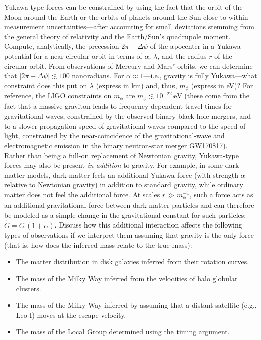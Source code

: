 \documentclass[12pt]{article}
\begin{document}
 Yukawa-type forces can be constrained by using
the fact that the orbit of the Moon around the Earth or the orbits of
planets around the Sun close to within measurement
uncertainties---after accounting for small deviations stemming from
the general theory of relativity and the Earth/Sun's quadrupole
moment. Compute, analytically, the precession $2\pi-\Delta \psi$ of
the apocenter in a Yukawa potential for a near-circular orbit in terms
of $\alpha$, $\lambda$, and the radius $r$ of the circular orbit. From
observations of Mercury and Mars' orbits, we can determine that
$|2\pi-\Delta \psi| \lesssim 100$ nanoradians. For $\alpha \approx
1$---i.e., gravity is fully Yukawa---what constraint does this put on
$\lambda$ (express in km) and, thus, $m_\phi$ (express in eV)? For
reference, the LIGO constraints on $m_\phi$ are $m_\phi \lesssim
10^{-22}\,\mathrm{eV}$ (these come from the fact that a massive
graviton leads to frequency-dependent travel-times for gravitational
waves, constrained by the observed binary-black-hole mergers, and to a
slower propagation speed of gravitational waves compared to the speed
of light, constrained by the near-coincidence of the
gravitational-wave and electromagnetic emission in the binary
neutron-star merger GW170817).\\

 Rather than being a full-on replacement of
Newtonian gravity, Yukawa-type forces may also be present \emph{in
  addition} to gravity. For example, in some dark matter models, dark
matter feels an additional Yukawa force (with strength $\alpha$
relative to Newtonian gravity) in addition to standard gravity, while
ordinary matter does not feel the additional force.  At scales $r \gg
m_\phi^{-1}$, such a force acts as an additional gravitational force
between dark-matter particles and can therefore be modeled as a simple
change in the gravitational constant for such particles: $\tilde{G} =
G\,(1+\alpha)$. Discuss how this additional interaction affects the
following types of observations if we interpret them assuming that
gravity is the only force (that is, how does the inferred mass relate
to the true mass):

\begin{itemize}
\item The matter distribution in disk galaxies inferred from their
  rotation curves.
\item The mass of the Milky Way inferred from the velocities of halo globular clusters.
\item The mass of the Milky Way inferred by assuming that a distant satellite (e.g., Leo I) moves at the escape velocity.
\item The mass of the Local Group determined using the timing
  argument.
\end{itemize}
\end{document}
